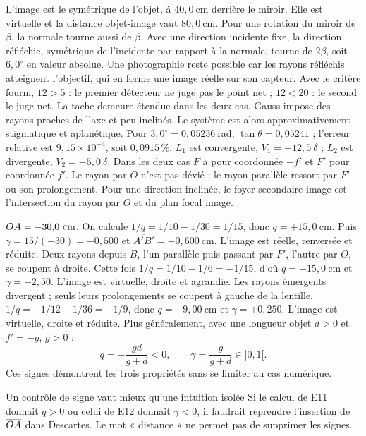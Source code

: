 L'image est le symétrique de l'objet, à $40{,}0\ \mathrm{cm}$ derrière le miroir. Elle est virtuelle et la distance objet-image vaut $80{,}0\ \mathrm{cm}$. Pour une rotation du miroir de $\beta$, la normale tourne aussi de $\beta$. Avec une direction incidente fixe, la direction réfléchie, symétrique de l'incidente par rapport à la normale, tourne de $2\beta$, soit $6{,}0^\circ$ en valeur absolue.
Une photographie reste possible car les rayons réfléchis atteignent l'objectif, qui en forme une image réelle sur son capteur.
Avec le critère fourni, $12>5$ : le premier détecteur ne juge pas le point net ; $12<20$ : le second le juge net. La tache demeure étendue dans les deux cas.
Gauss impose des rayons proches de l'axe et peu inclinés. Le système est alors approximativement stigmatique et aplanétique. Pour $3{,}0^\circ=0{,}05236\ \mathrm{rad}$, $\tan\theta=0{,}05241$ ; l'erreur relative est $9{,}15\times10^{-4}$, soit $0{,}0915\,\%$.
$L_1$ est convergente, $V_1=+12{,}5\ \delta$ ; $L_2$ est divergente, $V_2=-5{,}0\ \delta$. Dans les deux cas $F$ a pour coordonnée $-f'$ et $F'$ pour coordonnée $f'$. Le rayon par $O$ n'est pas dévié ; le rayon parallèle ressort par $F'$ ou son prolongement. Pour une direction inclinée, le foyer secondaire image est l'intersection du rayon par $O$ et du plan focal image.

$\overline{OA}=-30{,}0\ \mathrm{cm}$. On calcule $1/q=1/10-1/30=1/15$, donc $q=+15{,}0\ \mathrm{cm}$. Puis $\gamma=15/(-30)=-0{,}500$ et $\overline{A'B'}=-0{,}600\ \mathrm{cm}$. L'image est réelle, renversée et réduite. Deux rayons depuis $B$, l'un parallèle puis passant par $F'$, l'autre par $O$, se coupent à droite.
Cette fois $1/q=1/10-1/6=-1/15$, d'où $q=-15{,}0\ \mathrm{cm}$ et $\gamma=+2{,}50$. L'image est virtuelle, droite et agrandie. Les rayons émergents divergent ; seuls leurs prolongements se coupent à gauche de la lentille.
$1/q=-1/12-1/36=-1/9$, donc $q=-9{,}00\ \mathrm{cm}$ et $\gamma=+0{,}250$. L'image est virtuelle, droite et réduite.
Plus généralement, avec une longueur objet $d>0$ et $f'=-g$, $g>0$ :
\[q=-\frac{gd}{g+d}<0,\qquad\gamma=\frac{g}{g+d}\in]0,1[.\]
Ces signes démontrent les trois propriétés sans se limiter au cas numérique.
\begin{piege}{Un contrôle de signe vaut mieux qu'une intuition isolée}
Si le calcul de E11 donnait $q>0$ ou celui de E12 donnait $\gamma<0$, il faudrait reprendre l'insertion de $\overline{OA}$ dans Descartes. Le mot « distance » ne permet pas de supprimer les signes.
\end{piege}

